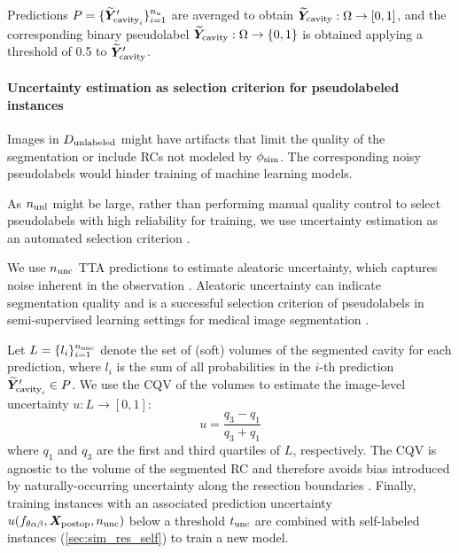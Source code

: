 Predictions $P = \{ \widetilde{\bm{Y}}'_{\text{cavity}_i} \}_{i=1}^{n_{\text{u}}}$ are averaged to obtain $\widetilde{\bm{Y}}_{\text{cavity}} : \Omega \to [0, 1]$, and the corresponding binary pseudolabel $\widetilde{\bm{Y}}_{\text{cavity}} : \Omega \to  \{ 0, 1 \}$ is obtained applying a threshold of 0.5 to $\widetilde{\bm{Y}}'_{\text{cavity}}$.


\paragraph{Uncertainty estimation as selection criterion for pseudolabeled instances}

Images in $D_{\text{unlabeled}}$ might have artifacts that limit the quality of the segmentation or include \acp{RC} not modeled by $\phi_{\text{sim}}$.
The corresponding noisy pseudolabels would hinder training of machine learning models.

As $n_{\text{unl}}$ might be large, rather than performing manual quality control to select pseudolabels with high reliability for training, we use uncertainty estimation as an automated selection criterion \cite{venturini_uncertainty_2020}.

We use $n_{\text{unc}}$ \ac{TTA} predictions to estimate aleatoric uncertainty, which captures noise inherent in the observation \cite{kendall_what_2017}.
Aleatoric uncertainty can indicate segmentation quality and is a successful selection criterion of pseudolabels in semi-supervised learning settings for medical image segmentation \cite{wang_aleatoric_2019,venturini_uncertainty_2020}.

Let $L = \{ l_i \}_{i = 1}^{n_{\text{unc}}}$ denote the set of (soft) volumes of the segmented cavity for each prediction, where $l_i$ is the sum of all probabilities in the $i$-th prediction $\widetilde{\bm{Y}}'_{\text{cavity}_i} \in P$.
We use the \ac{CQV} of the volumes \cite{zwillinger_crc_1999,wang_aleatoric_2019} to estimate the image-level uncertainty $u : L \to \left[0, 1\right]$:
\begin{equation}
    u = \frac{q_3 - q_1}{q_3 + q_1}
\end{equation}
where $q_1$ and $q_3$ are the first and third quartiles of $L$, respectively.
The \ac{CQV} is agnostic to the volume of the segmented \ac{RC} and therefore avoids bias introduced by naturally-occurring uncertainty along the resection boundaries \cite{jungo_analyzing_2020}.
Finally, training instances with an associated prediction uncertainty $u(f_{\theta\alpha\beta}, \bm{X}_{\text{postop}}, n_{\text{unc}})$ below a threshold $t_{\text{unc}}$ are combined with self-labeled instances (\cref{sec:sim_res_self}) to train a new model.

